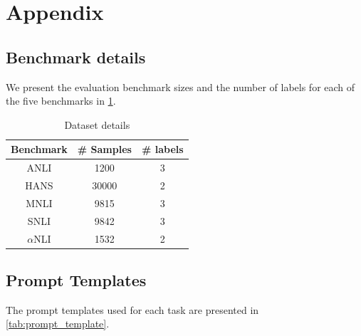 \section{Appendix}
\label{sec:appendix}

\subsection{Benchmark details}

We present the evaluation benchmark sizes and the number of labels for each of the five benchmarks in \cref{tab:dataset}.

\begin{table}
\centering
\begin{tabular}{c|c|c}
    Benchmark & \# Samples & \# labels \\
    \hline
    ANLI & 1200 & 3 \\
    HANS & 30000 & 2 \\
    MNLI & 9815 & 3 \\
    SNLI & 9842 & 3 \\
    $\alpha$NLI & 1532 & 2 \\
\end{tabular}
\caption{Dataset details}
\label{tab:dataset}
\end{table}

\subsection{Prompt Templates}

The prompt templates used for each task are presented in \cref{tab:prompt_template}.

